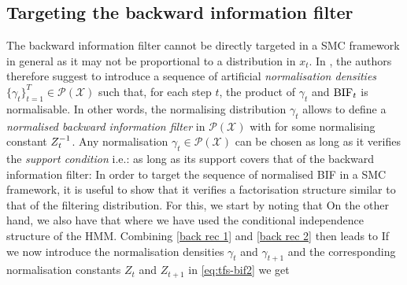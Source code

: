 \subsection{Targeting the backward information filter}
The backward information filter cannot be directly targeted in a SMC framework in general as it may not be proportional to a distribution in $x_{t}$. 
In \citet{briers10}, the authors therefore suggest to introduce a sequence of artificial \emph{normalisation densities} $\{\gamma_{t}\}_{t=1}^{T}\in\mathcal P(\mathcal X)$ such that, for each step $t$, the product of $\gamma_{t}$ and $\text{BIF}_{t}$ is normalisable. 
In other words, the normalising distribution $\gamma_{t}$ allows to define a \emph{normalised backward information filter} in $\mathcal P(\mathcal X)$ with
%
%
for some normalising constant $Z^{-1}_{t}$.
Any normalisation $\gamma_{t}\in\mathcal P(\mathcal X)$ can be chosen as long as it verifies the \emph{support condition} i.e.: as long as its support covers that of the backward information filter:
%
%
In order to target the sequence of normalised BIF in a SMC framework, it is useful to show that it verifies a factorisation structure similar to that of the filtering distribution. For this, we start by noting that
%
%
On the other hand, we also have that
%
%
where we have used the conditional independence structure of the HMM. 
Combining \eqref{back rec 1} and \eqref{back rec 2} then leads to
%
%
If we now introduce the normalisation densities $\gamma_{t}$ and $\gamma_{t+1}$ and the corresponding normalisation constants $Z_{t}$ and $Z_{t+1}$ in \eqref{eq:tfs-bif2} we get
%
